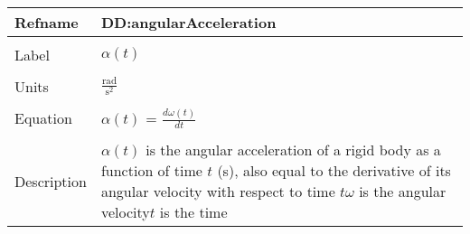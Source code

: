 \documentclass[12pt]{article}
\begin{document}
~\newline
\noindent \begin{minipage}{\textwidth}
\begin{tabular}{p{} p{}}
\toprule \textbf{Refname} & \textbf{DD:angularAcceleration}
\label{DD:angularAcceleration}
\\ \midrule \\
Label & $\alpha{}(t)$
\\ \midrule \\
Units & $\frac{\text{rad}}{\text{s}^{2}}$
\\ \midrule \\
Equation & $\alpha{}(t)$ = $\frac{d\omega{}(t)}{dt}$
\\ \midrule \\
Description & $\alpha{}(t)$ is the angular acceleration of a rigid body as a function of time $t$ (s), also equal to the derivative of its angular velocity with respect to time $t$\newline$\omega{}$ is the angular velocity\newline$t$ is the time
\\ \bottomrule \end{tabular}
\end{minipage}\\
~\newline
\end{document}
